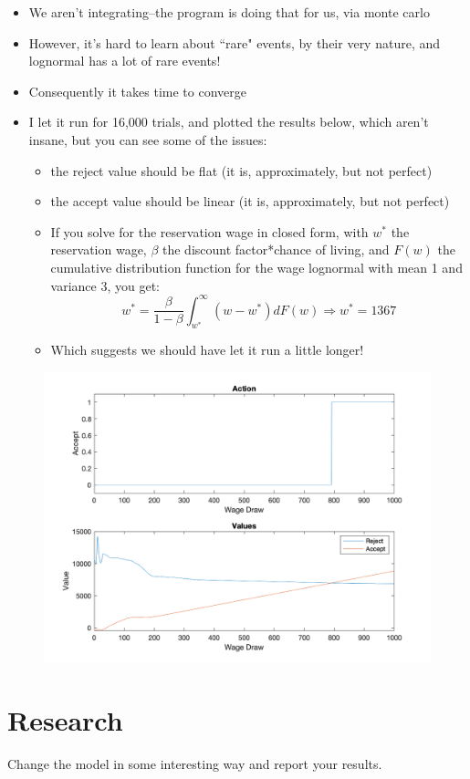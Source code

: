 \documentclass[11pt]{article}
\begin{document}
  \begin{itemize}
  \item We aren't integrating--the program is doing that for us, via monte carlo
  \item However, it's hard to learn about ``rare" events, by their very nature, and lognormal has a lot of rare events!
  \item Consequently it takes time to converge
  \item I let it run for 16,000 trials, and plotted the results below, which aren't insane, but you can see some of the issues:  
  \begin{itemize}
  \item the reject value should be flat (it is, approximately, but not perfect)
  \item the accept value should be linear (it is, approximately, but not perfect)
  \item If you solve for the reservation wage in closed form, with $w^*$ the reservation wage, $\beta$ the discount factor*chance of living, and $F(w)$ the cumulative distribution function for the wage lognormal with mean 1 and variance 3, you get:
  $$w^*=\frac{\beta}{1-\beta}\int_{w^*}^\infty(w-w^*)dF(w)\Rightarrow w^*=1367$$
  \item Which suggests we should have let it run a little longer!
  \end{itemize}
  \end{itemize}
  
  \begin{figure}[ht!]
  \includegraphics[scale=0.4]{Figure1.png}
  \end{figure}

 \section{Research}
 Change the model in some interesting way and report your results.
\end{document}
